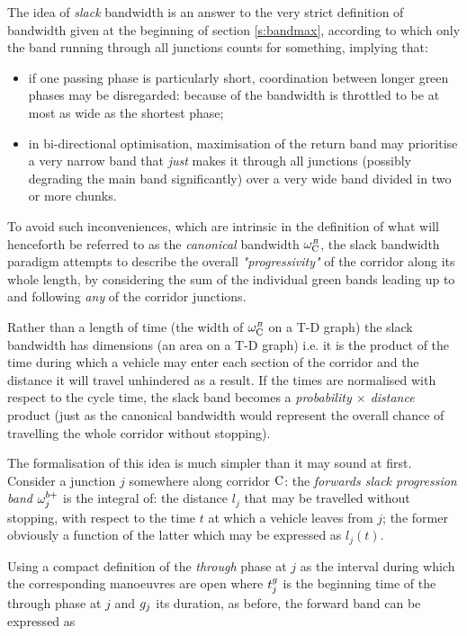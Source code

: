 The idea of \emph{slack} bandwidth is an answer to the very strict definition of bandwidth given at the beginning of section \ref{s:bandmax}, according to which only the band running through all junctions counts for something, implying that:
\begin{itemize}
\item if one passing phase is particularly short, coordination between longer green phases may be disregarded: because of  the bandwidth is throttled to be at most as wide as the shortest phase;
\item in bi-directional optimisation, maximisation of the return band may prioritise a very narrow band that \emph{just} makes it through all junctions (possibly degrading the main band significantly) over a very wide band divided in two or more chunks.
\end{itemize}

To avoid such inconveniences, which are intrinsic in the definition of what will henceforth be referred to as the \emph{canonical} bandwidth $\omega_{\mathrm{C}}^{\scriptscriptstyle{B}}$, the slack bandwidth paradigm attempts to describe the overall \emph{"progressivity"} of the corridor along its whole length, by considering the sum of the individual green bands leading up to and following \emph{any} of the corridor junctions.

Rather than a length of time (the width of $\omega_{\mathrm{C}}^{\scriptscriptstyle{B}}$ on a T-D graph) the slack bandwidth has dimensions  (an area on a T-D graph) i.e. it is the product of the time during which a vehicle may enter each section of the corridor and the distance it will travel unhindered as a result. If the times are normalised with respect to the cycle time, the slack band becomes a \emph{probability $\times$ distance} product (just as the canonical bandwidth would represent the overall chance of travelling the whole corridor without stopping).

The formalisation of this idea is much simpler than it may sound at first. 
Consider a junction $j$ somewhere along corridor $\mathrm{C}$: the \emph{forwards slack progression band} $\omega_{j}^{\scriptstyle{b+}}$ is the integral of: the distance $l_j$ that may be travelled without stopping, with respect to the time $t$ at which a vehicle leaves from $j$; the former obviously a function of the latter which may be expressed as $l_j(t)$.

Using a compact definition of the \emph{through} phase at $j$ as the interval during which the corresponding manoeuvres are open
where $t_{j}^{\scriptstyle{g}}$ is the beginning time of the through phase at $j$ and $g_{j}$ its duration, as before, the forward band can be expressed as

